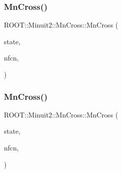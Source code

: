 \subsubsection{\texorpdfstring{MnCross()}{MnCross()}\hspace{0.1cm}{\footnotesize\ttfamily [14/24]}}
{\footnotesize\ttfamily R\+O\+O\+T\+::\+Minuit2\+::\+Mn\+Cross\+::\+Mn\+Cross (\begin{DoxyParamCaption}\item[{const \mbox{\hyperlink{classROOT_1_1Minuit2_1_1MnUserParameterState}{Mn\+User\+Parameter\+State}} \&}]{state,  }\item[{unsigned int}]{nfcn,  }\item[{\mbox{\hyperlink{classROOT_1_1Minuit2_1_1MnCross_1_1CrossFcnLimit}{Cross\+Fcn\+Limit}}}]{ }\end{DoxyParamCaption})\hspace{0.3cm}{\ttfamily [inline]}}

\mbox{\label{classROOT_1_1Minuit2_1_1MnCross_a8508fcf20167952cb8f53427d348e2dc}} 
\subsubsection{\texorpdfstring{MnCross()}{MnCross()}\hspace{0.1cm}{\footnotesize\ttfamily [15/24]}}
{\footnotesize\ttfamily R\+O\+O\+T\+::\+Minuit2\+::\+Mn\+Cross\+::\+Mn\+Cross (\begin{DoxyParamCaption}\item[{const \mbox{\hyperlink{classROOT_1_1Minuit2_1_1MnUserParameterState}{Mn\+User\+Parameter\+State}} \&}]{state,  }\item[{unsigned int}]{nfcn,  }\item[{\mbox{\hyperlink{classROOT_1_1Minuit2_1_1MnCross_1_1CrossNewMin}{Cross\+New\+Min}}}]{ }\end{DoxyParamCaption})\hspace{0.3cm}{\ttfamily [inline]}}

\mbox{\label{classROOT_1_1Minuit2_1_1MnCross_a34f9825f828387bc92e6e7aaac8ced84}} 
